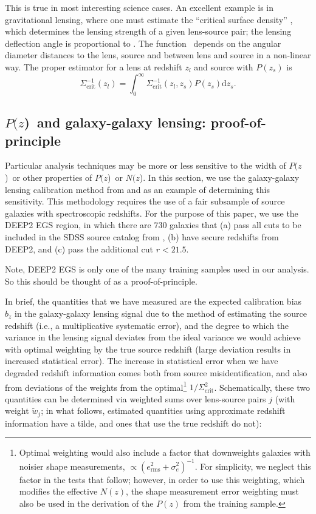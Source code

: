 \documentclass[preprint]{aastex}
\newcommand{\pofz}{$P(z$)}
\newcommand{\nofz}{$N(z$)}
\begin{document}
This is true in most interesting science cases.  An excellent example is in
gravitational lensing, where one must estimate the ``critical surface density''
\sigmacrit, which determines the lensing strength of a given lens-source pair; the
lensing deflection angle is proportional to \scinv.  The function
\sigmacrit\ depends on the angular diameter distances to the lens, source and
between lens and source in a non-linear way.  The proper estimator for a lens
at redshift $z_{l}$ and source with $P(z_s)$ is
\begin{equation} \label{eq:calcscrit}
\Sigma^{-1}_{\mathrm{crit}}(z_l) = 
    \int_{0}^{\infty} \Sigma_{\mathrm{crit}}^{-1}(z_l, z_s) P(z_s) \mathrm{d}z_s.
\end{equation}


\subsection{\pofz\ and galaxy-galaxy lensing: proof-of-principle} \label{sec:pofp}

Particular analysis techniques may be more or less sensitive to the width of
\pofz\ or other properties of \pofz\ or \nofz.  In this section, we use the
galaxy-galaxy lensing calibration method from \cite{man08} and
\citet{Nakajima11} as an example of determining this sensitivity.
This methodology requires the use of a fair subsample of source galaxies with
spectroscopic redshifts.  For the purpose of this paper, we use the DEEP2 EGS
region, in which there are 730 galaxies that (a) pass all cuts to be included
in the SDSS source catalog from \citet{MandelbaumSystematics05}, (b) have
secure redshifts from DEEP2, and (c) pass the additional cut $r<21.5$.

Note, DEEP2 EGS is only one of the many training samples used in our analysis.
So this should be thought of as a proof-of-principle.

In brief, the quantities that we have measured are the expected calibration
bias $b_z$ in the galaxy-galaxy lensing signal due to the method of estimating
the source redshift (i.e., a multiplicative systematic error), and the degree to
which the variance in the lensing signal deviates from the ideal variance we
would achieve with optimal weighting by the true source redshift (large
deviation results in increased statistical error).  The increase in statistical
error when we have degraded redshift information comes both from source
misidentification, and also from deviations of the weights from the
optimal\footnote{Optimal weighting would also include a factor that downweights
galaxies with noisier shape measurements, $\propto (e_\mathrm{rms}^2 +
\sigma_e^2)^{-1}$.  For simplicity, we neglect this factor in the tests that
follow; however, in order to use this weighting, which modifies the effective
$N(z)$, the shape measurement error weighting must also be used in the
derivation of the $P(z)$ from the training sample.} $1/\Sigma_\mathrm{crit}^2$.
Schematically, these two quantities can be determined via weighted sums over
lens-source pairs $j$ (with weight $\tilde{w}_j$; in what follows, estimated
quantities using approximate redshift information have a tilde, and ones that
use the true redshift do not):
\end{document}
